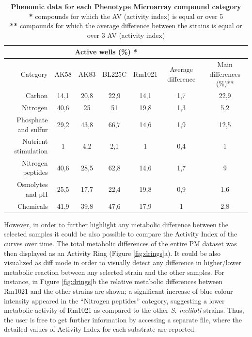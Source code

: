 \begin{table}
  \centering
  	\begin{tabular*}{\textwidth}{rccccrr}
    \toprule
    \multicolumn{1}{c}{} & \multicolumn{4}{c}{Active wells (\%) *} &       &  \\
    \midrule
    Category & AK58  & AK83  & BL225C & Rm1021 & \multicolumn{1}{c}{Average difference} & \multicolumn{1}{c}{Main differences (\%)** } \\
    Carbon & 14,1  & 20,8  & 22,9  & 14,1  & \multicolumn{1}{c}{1,7} & \multicolumn{1}{c}{22,9} \\
    Nitrogen & 40,6  & 25    & 51    & 19,8  & \multicolumn{1}{c}{1,3} & \multicolumn{1}{c}{5,2} \\
    Phosphate and sulfur & 29,2  & 43,8  & 66,7  & 14,6  & \multicolumn{1}{c}{1,9} & \multicolumn{1}{c}{12,5} \\
    Nutrient stimulation & 1     & 4,2   & 2,1   & 1     & \multicolumn{1}{c}{0,4} & \multicolumn{1}{c}{1} \\
    Nitrogen peptides & 40,6  & 28,5  & 62,8  & 14,6  & \multicolumn{1}{c}{1,7} & \multicolumn{1}{c}{9} \\
    Osmolytes and pH & 25,5  & 17,7  & 22,4  & 19,8  & \multicolumn{1}{c}{0,9} & \multicolumn{1}{c}{1,6} \\
    Chemicals & 41,9  & 39,8  & 47,6  & 17,9  & \multicolumn{1}{c}{1} & \multicolumn{1}{c}{2,8} \\
    \bottomrule
   \end{tabular*} 
  \caption{\textbf{Phenomic data for each Phenotype Microarray compound category}\\
  \textbf{*} compounds for which the AV (activity index) is equal or over 5\\
\textbf{**} compounds for which the average difference between the strains is equal or over 3 AV (activity index)}
  \label{tab:ductcateg}%
\end{table}

However, in order to further highlight any metabolic difference between the selected samples it could be also possible to compare the Activity Index of the curves over time. The total metabolic differences of the entire PM dataset was then displayed as an Activity Ring (Figure \ref{fig:drings}a). It could be also visualized as diff mode in order to visually detect any difference in higher/lower metabolic reaction between any selected strain and the other samples. For instance, in Figure \ref{fig:drings}b the relative metabolic differences between Rm1021 and the other strains are shown; a significant increase of blue colour intensity appeared in the “Nitrogen peptides” category, suggesting a lower metabolic activity of Rm1021 as compared to the other \textit{S. meliloti} strains. Thus, the user is free to get further information by accessing a separate file, where the detailed values of Activity Index for each substrate are reported.

